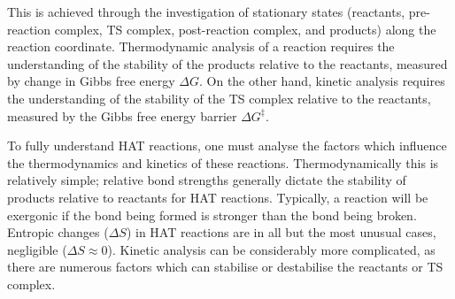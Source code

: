 This is achieved through the investigation of stationary states (reactants, pre-reaction complex, TS complex, post-reaction complex, and products) along the reaction coordinate. Thermodynamic analysis of a reaction requires the understanding of the stability of the products relative to the reactants, measured by change in Gibbs free energy $\Delta G$. On the other hand, kinetic analysis requires the understanding of the stability of the TS complex relative to the reactants, measured by the Gibbs free energy barrier $\Delta G^{\ddagger}$.

To fully understand HAT reactions, one must analyse the factors which influence the thermodynamics and kinetics of these reactions. Thermodynamically this is relatively simple; relative bond strengths generally dictate the stability of products relative to reactants for HAT reactions. Typically, a reaction will be exergonic if the bond being formed is stronger than the bond being broken. Entropic changes ($\Delta S$) in HAT reactions are in all but the most unusual cases, negligible ($\Delta S \approx 0$).\cite{Mader2007} Kinetic analysis can be considerably more complicated, as there are numerous factors which can stabilise or destabilise the reactants or TS complex.
